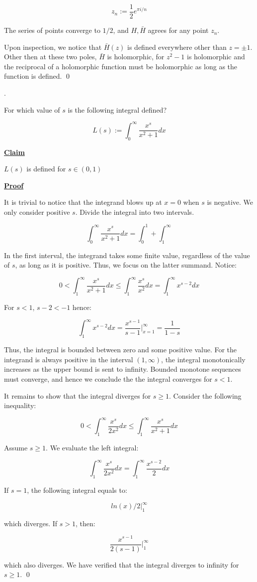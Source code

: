 \documentclass{article}
\newcommand{\new}[1]{
    \vspace{2mm}
    \noindent
    \textbf{
    \underline{#1}}
}
\newcounter{problemcnt}
\newcommand{\Problem}{{
    \vspace{5mm}
    \stepcounter{problemcnt}
    \noindent
    \arabic{problemcnt}. 
}
}
\newcommand{\Proof}{{
    \vspace{2mm}
    \noindent
    \textbf{
    \underline{Proof}}
}
}
\begin{document}
\[
    z_n := \frac{1}{2}e^{\pi i / n}
\]

The series of points converge to $1/2$, and $H, \bar{H}$ agrees 
for any point $z_n$.

Upon inspection, we notice that $\bar{H}(z)$ is defined everywhere 
other than $z = \pm 1$. Other then at these two poles, 
$\bar{H}$ is holomorphic, for $z^2-1$ is holomorphic and the 
reciprocal of a holomorphic function must be holomorphic as long 
as the function is defined. 
\qed


\newpage
\Problem
For which value of $s$ is the following 
integral defined?

\[
    L(s):= 
    \int_{0}^\infty \frac{x^s }{x^2+1}dx
\]

\new{Claim}
$L(s)$ is defined for $s \in (0, 1)$

\Proof
It is trivial to notice that the integrand blows up at $x = 0$ 
when $s$ is negative. We only consider positive $s$. Divide 
the integral into two intervals. 

\[
    \int_{0}^\infty \frac{x^s }{x^2+1}dx
    = \int_{0}^1+\int_1^\infty
\]

In the first interval, the integrand takes some finite 
value, regardless of the value of $s$, as long as it is positive. 
Thus, we focus on the latter summand. Notice:

\[
    0<
    \int_{1}^\infty \frac{x^s }{x^2+1}dx \leq
    \int_{1}^\infty \frac{x^s }{x^2}dx
    =
    \int_{1}^\infty  x^{s-2}dx
\]

For $s < 1$, $s-2 < -1$ hence:

\[
    \int_{1}^\infty  x^{s-2}dx
    = \frac{x^{s-1}}{s-1}\bigg|_{x = 1}^\infty = \frac{1}{1-s}
\]

Thus, the integral is bounded between zero and some positive value. 
For the integrand is always positive in the interval $(1, \infty)$,
the integral monotonically increases as the upper bound is sent 
to infinity. Bounded monotone sequences must converge, and hence 
we conclude the the integral converges for $s<1$. 

It remains to show that the integral diverges for $s\geq 1$. 
Consider the following inequality:

\[
    0<
    \int_{1}^\infty \frac{x^s }{2x^2}dx \leq
    \int_{1}^\infty \frac{x^s }{x^2+1}dx
\]

Assume $s \geq 1$. We evaluate the left integral:

\[
    \int_{1}^\infty \frac{x^s }{2x^2}dx =
    \int_{1}^\infty \frac{x^{s-2}}{2}dx
\]

If $s = 1$, the following integral equals to:

\[
    ln(x)/2\bigg|_1^\infty
\]

which diverges. If $s > 1$, then:

\[
    \frac{x^{s-1}}{2(s-1)}\bigg|_1^\infty
\]

which also diverges. We have verified that 
the integral diverges to infinity for $s \geq 1$. \qed
\end{document}

